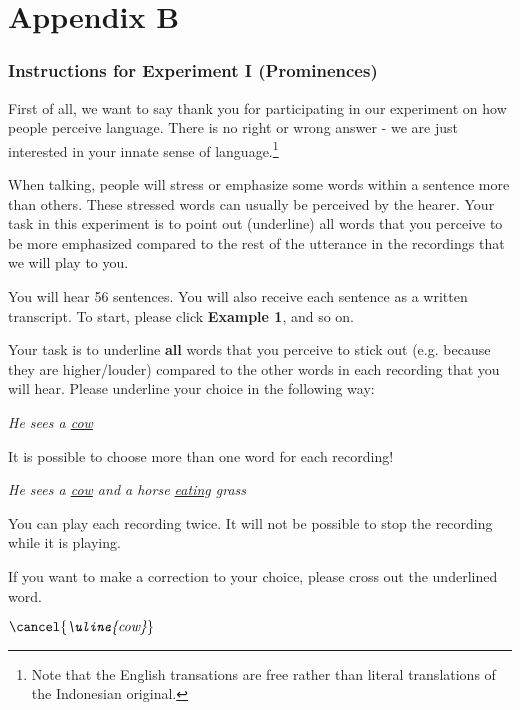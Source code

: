 \documentclass[output=paper
,modfonts
,nonflat]{langsci/langscibook}
\begin{document}
\section*{Appendix B}

\subsubsection*{\textbf{Instructions for Experiment I (Prominences)}}

First of all, we want to say thank you for participating in our experiment on how people perceive language. There is no right or wrong answer - we are just interested in your innate sense of language.\footnote{Note that the English transations are free rather than literal translations of the Indonesian original.}

When talking, people will stress or emphasize some words within a sentence more than others. These stressed words can usually be perceived by the hearer. Your task in this experiment is to point out (underline) all words that you perceive to be more emphasized compared to the rest of the utterance in the recordings that we will play to you.

You will hear 56 sentences. You will also receive each sentence as a written transcript. To start, please click \textbf{Example 1}, and so on.

Your task is to underline \textbf{all} words that you perceive to stick out (e.g. because they are higher/louder) compared to the other words in each recording that you will hear. Please underline your choice in the following way:

\begin{center}
\textit{He sees a \uline{cow}}
\end{center}

\noindent
It is possible to choose more than one word for each recording!

\begin{center}
\textit{He sees a \uline{cow} and a horse \uline{eating} grass}
\end{center}

\noindent
You can play each recording twice. It will not be possible to stop the recording while it is playing.

If you want to make a correction to your choice, please cross out the underlined word.

\begin{center}
\( \cancel{\textit{\uline{cow}}} \)
\end{center}
\end{document}

